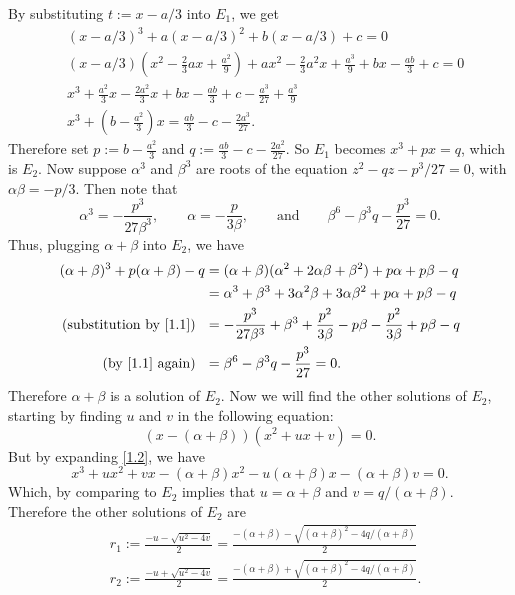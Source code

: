 \documentclass[12pt]{article}
\begin{document}
By substituting $t := x - a/3$ into $E_{1}$, we get 
\begin{align*}
& (x - a/3)^{3} + a(x-a/3)^{2} + b(x-a/3) + c = 0 \\
& (x -a/3)\left(x^{2} - \frac{2}{3}ax + \frac{a^{2}}{9}\right) + ax^{2} - \frac{2}{3}a^{2}x + \frac{a^{3}}{9} + bx - \frac{ab}{3} + c = 0 \\
& x^{3} + \frac{a^{2}}{3}x - \frac{2a^{2}}{3}x + bx - \frac{ab}{3} + c - \frac{a^{3}}{27} + \frac{a^{3}}{9} \\
& x^{3} + \left( b - \frac{a^{2}}{3} \right)x = \frac{ab}{3} - c - \frac{2a^{3}}{27}.
\end{align*}
Therefore set $p := b - \frac{a^{2}}{3}$ and $q := \frac{ab}{3} - c - \frac{2a^{2}}{27}$. So $E_{1}$ becomes $x^{3} + px = q$, which is $E_{2}$. Now
suppose $\alpha^{3}$ and $\beta^{3}$ are roots of the equation $z^{2} - qz - p^{3}/27 = 0$, with $\alpha\beta = -p/3$. Then note that 
\begin{equation}
\alpha^{3} = - \frac{p^{3}}{27\beta^{3}}, \qquad \alpha = - \frac{p}{3\beta}, \qquad \text{and} \qquad \beta^{6} - \beta^{3}q - \frac{p^{3}}{27} =
0. 
\label{1.1}
\end{equation}
Thus, plugging $\alpha + \beta$ into $E_{2}$, we have 
\begin{align*}
(\alpha + \beta)^{3} + p(\alpha + \beta) - q & = (\alpha + \beta)(\alpha^{2} + 2\alpha\beta + \beta^{2}) + p\alpha + p\beta - q \\
&= \alpha^{3} + \beta^{3} + 3\alpha^{2}\beta + 3\alpha\beta^{2} + p\alpha + p\beta - q \\
\text{(substitution by \eqref{1.1}) } \ & = -\frac{p^{3}}{27\beta^{3}} + \beta^{3} + \frac{p^{2}}{3\beta} - p\beta - \frac{p^{2}}{3\beta} + p\beta - q \\
\text{(by \eqref{1.1} again) }\ &= \beta^{6} - \beta^{3}q - \frac{p^{3}}{27} = 0.
\end{align*}
Therefore $\alpha + \beta$ is a solution of $E_{2}$. Now we will find the other solutions of $E_{2}$, starting by finding $u$ and $v$ in the following equation:
\begin{equation}
(x - (\alpha + \beta))(x^{2} + ux + v) = 0.
\label{1.2}
\end{equation}
But by expanding \eqref{1.2}, we have 
\[ x^{3} + ux^{2} + vx - (\alpha + \beta)x^{2} - u(\alpha + \beta)x - (\alpha + \beta)v = 0. \]
Which, by comparing to $E_{2}$ implies that $u = \alpha + \beta$ and $v = q / (\alpha + \beta)$. Therefore the other solutions of $E_{2}$ are 
\begin{align*}
& r_{1} := \frac{-u - \sqrt{u^{2} - 4v}}{2} = \frac{-(\alpha + \beta) - \sqrt{(\alpha+\beta)^{2} - 4q/(\alpha+\beta)}}{2} \\
& r_{2} := \frac{-u + \sqrt{u^{2} - 4v}}{2} = \frac{-(\alpha + \beta) + \sqrt{(\alpha+\beta)^{2} - 4q/(\alpha+\beta)}}{2}. \\
\end{align*}
\end{document}
